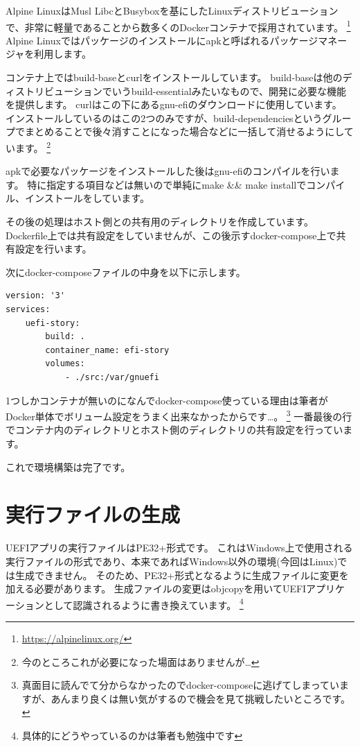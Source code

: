 \documentclass[10pt,b5paper,twoside,openany]{ltjsbook}
\begin{document}
Alpine LinuxはMusl LibcとBusyboxを基にしたLinuxディストリビューションで、非常に軽量であることから数多くのDockerコンテナで採用されています。
\footnote{\url{https://alpinelinux.org/}}
Alpine Linuxではパッケージのインストールにapkと呼ばれるパッケージマネージャを利用します。

コンテナ上ではbuild-baseとcurlをインストールしています。
build-baseは他のディストリビューションでいうbuild-essentialみたいなもので、開発に必要な機能を提供します。
curlはこの下にあるgnu-efiのダウンロードに使用しています。
インストールしているのはこの2つのみですが、build-dependenciesというグループでまとめることで後々消すことになった場合などに一括して消せるようにしています。
\footnote{今のところこれが必要になった場面はありませんが…}

apkで必要なパッケージをインストールした後はgnu-efiのコンパイルを行います。
特に指定する項目などは無いので単純にmake \&\& make installでコンパイル、インストールをしています。

その後の処理はホスト側との共有用のディレクトリを作成しています。
Dockerfile上では共有設定をしていませんが、この後示すdocker-compose上で共有設定を行います。

次にdocker-composeファイルの中身を以下に示します。
\begin{lstlisting}[style=customBash,caption=docker-compose,label=prog:docker-compose]
version: '3'
services:
    uefi-story:
        build: .
        container_name: efi-story
        volumes:
            - ./src:/var/gnuefi
\end{lstlisting}
1つしかコンテナが無いのになんでdocker-compose使っている理由は筆者がDocker単体でボリューム設定をうまく出来なかったからです…。
\footnote{真面目に読んでて分からなかったのでdocker-composeに逃げてしまっていますが、あんまり良くは無い気がするので機会を見て挑戦したいところです。}    
一番最後の行でコンテナ内のディレクトリとホスト側のディレクトリの共有設定を行っています。

これで環境構築は完了です。

\section{実行ファイルの生成}
UEFIアプリの実行ファイルはPE32+形式です。
これはWindows上で使用される実行ファイルの形式であり、本来であればWindows以外の環境(今回はLinux)では生成できません。
そのため、PE32+形式となるように生成ファイルに変更を加える必要があります。
生成ファイルの変更はobjcopyを用いてUEFIアプリケーションとして認識されるように書き換えています。
\footnote{具体的にどうやっているのかは筆者も勉強中です}
\end{document}
